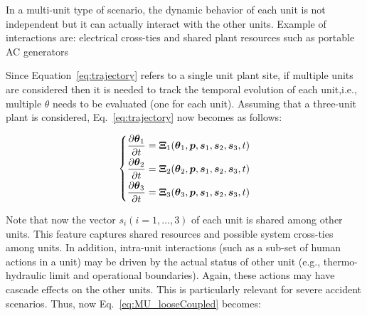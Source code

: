 In a multi-unit type of scenario, the dynamic behavior of each unit is not independent but it can actually 
interact with the other units. Example of interactions are: electrical cross-ties and shared plant 
resources such as portable AC generators

Since Equation~\ref{eq:trajectory} refers to a single unit plant site, if multiple units are considered 
then it is needed to track the temporal evolution of each unit,i.e., multiple $\theta$ needs to be evaluated 
(one for each unit). 
Assuming that a three-unit plant is considered, Eq.~\ref{eq:trajectory} now becomes as follows:

\begin{equation}
  \begin{matrix}
     \begin{dcases*}
       \frac{\partial \boldsymbol{\theta}_1}{\partial t}  = \boldsymbol{\Xi}_1 (\boldsymbol{\theta}_1 , \boldsymbol p, \boldsymbol{s}_1 , \boldsymbol{s}_2 , \boldsymbol{s}_3, t)  \\     
       \frac{\partial \boldsymbol{\theta}_2}{\partial t}  = \boldsymbol{\Xi}_2 (\boldsymbol{\theta}_2 , \boldsymbol p, \boldsymbol{s}_1 , \boldsymbol{s}_2 , \boldsymbol{s}_3, t)  \\   
       \frac{\partial \boldsymbol{\theta}_3}{\partial t}  = \boldsymbol{\Xi}_3 (\boldsymbol{\theta}_3 , \boldsymbol p, \boldsymbol{s}_1 , \boldsymbol{s}_2 , \boldsymbol{s}_3, t)  \\       
     \end{dcases*}
  \end{matrix}
  \label{eq:MU_looseCoupled}
\end{equation}

Note that now the vector $s_i (i=1,\ldots,3)$ of each unit is shared among other units. This feature 
captures shared resources and possible system cross-ties among units.
In addition, intra-unit interactions (such as a sub-set of human actions in a unit) may be driven 
by the actual status of other unit (e.g., thermo-hydraulic limit and operational boundaries). 
Again, these actions may have cascade effects on the other units. This is particularly relevant 
for severe accident scenarios. Thus, now Eq.~\ref{eq:MU_looseCoupled} becomes:

